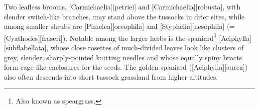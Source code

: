 Two leafless brooms, [Carmichaelia][petriei] and [Carmichaelia][robusta], with slender switch-like branches, may stand above the tussocks in drier sites, while among smaller shrubs are [Pimelea][oreophila] and [Styphelia][nesophila] (= [Cyathodes][fraseri]).
Notable among the larger herbs is the spaniard\footnote{Also known as speargrass.} [Aciphylla][subflabellata], whose close rosettes of much-divided leaves look like clusters of grey, slender, sharply-pointed knitting needles and whose equally spiny bracts form cage-like enclosures for the seeds.
The golden spaniard ([Aciphylla][aurea]) also often descends into short tussock grassland from higher altitudes.

